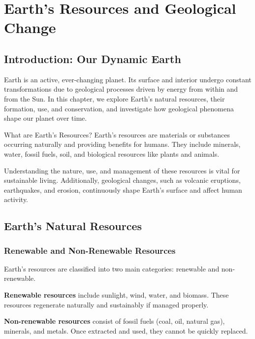 \chapter{Earth's Resources and Geological Change}

\section{Introduction: Our Dynamic Earth}

Earth is an active, ever-changing planet. Its surface and interior undergo constant transformations due to geological processes driven by energy from within and from the Sun. In this chapter, we explore Earth's natural resources, their formation, use, and conservation, and investigate how geological phenomena shape our planet over time.

\begin{keyconcept}{What are Earth's Resources?}
Earth's resources are materials or substances occurring naturally and providing benefits for humans. They include minerals, water, fossil fuels, soil, and biological resources like plants and animals.
\end{keyconcept}

Understanding the nature, use, and management of these resources is vital for sustainable living. Additionally, geological changes, such as volcanic eruptions, earthquakes, and erosion, continuously shape Earth's surface and affect human activity.

\section{Earth's Natural Resources}

\subsection{Renewable and Non-Renewable Resources}

Earth's resources are classified into two main categories: renewable and non-renewable.

\textbf{Renewable resources} include sunlight, wind, water, and biomass. These resources regenerate naturally and sustainably if managed properly.

\textbf{Non-renewable resources} consist of fossil fuels (coal, oil, natural gas), minerals, and metals. Once extracted and used, they cannot be quickly replaced.

